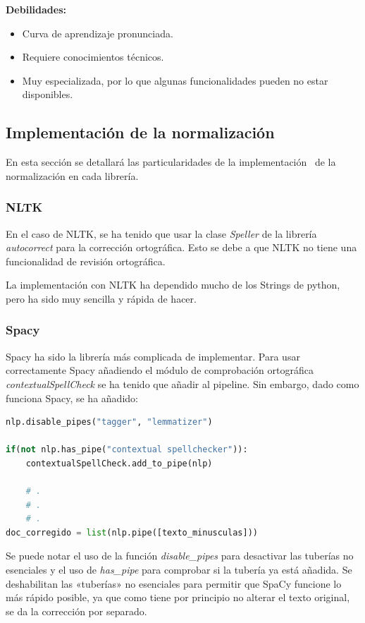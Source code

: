 \documentclass[a4paper,twocolumn]{article}
\begin{document}
    \textbf{Debilidades:}
    \begin{itemize}
        \item Curva de aprendizaje pronunciada.
        \item Requiere conocimientos técnicos.
        \item Muy especializada, por lo que algunas funcionalidades pueden no estar disponibles.
    \end {itemize}

    \subsection{Implementación de la normalización}\label{subsec:implementacion-de-la-normalizacion}
    En esta sección se detallará las particularidades de la implementación~\cite{marcelo.implementaciones} de la normalización en cada librería.

    \subsubsection{NLTK}\label{subsubsec:nltk_impl}
    En el caso de NLTK, se ha tenido que usar la clase \textit{Speller} de la librería \textit{autocorrect} para la corrección ortográfica.
    Esto se debe a que NLTK no tiene una funcionalidad de revisión ortográfica.

    La implementación con NLTK ha dependido mucho de los Strings de python, pero ha sido muy sencilla y rápida de hacer.

    \subsubsection{Spacy}\label{subsubsec:spacy_impl}
    Spacy ha sido la librería más complicada de implementar.
    Para usar correctamente Spacy añadiendo el módulo de comprobación ortográfica \textit{contextualSpellCheck} se ha tenido que añadir al pipeline.
    Sin embargo, dado como funciona Spacy, se ha añadido:
    \begin{lstlisting}[language=Python,label={lst:codigoSpellSpacy},basicstyle=\scriptsize]
nlp.disable_pipes("tagger", "lemmatizer")

if(not nlp.has_pipe("contextual spellchecker")):
    contextualSpellCheck.add_to_pipe(nlp)

    # .
    # .
    # .
doc_corregido = list(nlp.pipe([texto_minusculas]))
    \end{lstlisting}

    Se puede notar el uso de la función \textit{disable\_pipes} para desactivar las tuberías no esenciales y el uso de \textit{has\_pipe} para comprobar si la tubería ya está añadida.
    Se deshabilitan las «tuberías» no esenciales para permitir que SpaCy funcione lo más rápido posible,
    ya que como tiene por principio no alterar el texto original, se da la corrección por separado.
\end{document}
